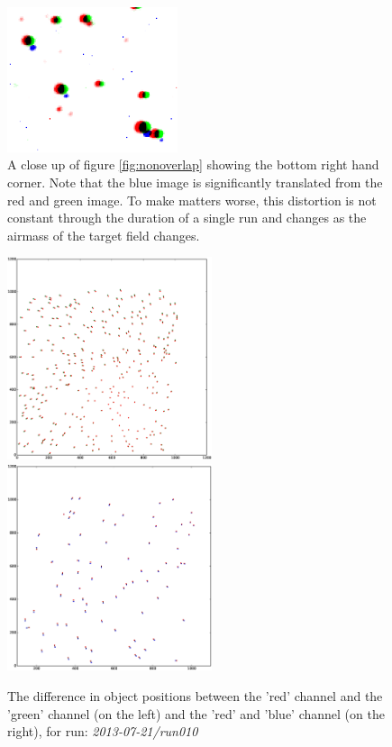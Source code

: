 \begin{figure}
  \centering
  \includegraphics[width=50mm]{images/overlay_multiply_closeup.png}
  \caption{A close up of figure \ref{fig:nonoverlap} showing the bottom right hand corner. Note that the blue image is significantly translated from the red and green image. To make matters worse, this distortion is not constant through the duration of a single run and changes as the airmass of the target field changes.}
\label{fig:nonoverlapzoom}
\end{figure}

\begin{figure}
  \centering
  \includegraphics[width=60mm]{images/objectOffset_run010_g.eps}
  \includegraphics[width=60mm]{images/objectOffset_run010_b.eps}
  \caption{The difference in object positions between the 'red' channel and the 'green' channel (on the left) and the 'red' and 'blue' channel (on the right), for run: \emph{2013-07-21/run010} }
\label{fig:greenblueoffset}
\end{figure}



